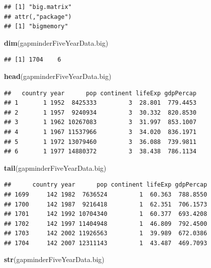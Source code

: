\documentclass[]{article}
\newenvironment{Shaded}{\begin{snugshade}}{\end{snugshade}}
\newcommand{\KeywordTok}[1]{\textcolor[rgb]{0.13,0.29,0.53}{\textbf{{#1}}}}
\newcommand{\NormalTok}[1]{{#1}}
\begin{document}
\begin{verbatim}
## [1] "big.matrix"
## attr(,"package")
## [1] "bigmemory"
\end{verbatim}

\begin{Shaded}
\begin{Highlighting}[]
\KeywordTok{dim}\NormalTok{(gapminderFiveYearData.big)}
\end{Highlighting}
\end{Shaded}

\begin{verbatim}
## [1] 1704    6
\end{verbatim}

\begin{Shaded}
\begin{Highlighting}[]
\KeywordTok{head}\NormalTok{(gapminderFiveYearData.big)}
\end{Highlighting}
\end{Shaded}

\begin{verbatim}
##   country year      pop continent lifeExp gdpPercap
## 1       1 1952  8425333         3  28.801  779.4453
## 2       1 1957  9240934         3  30.332  820.8530
## 3       1 1962 10267083         3  31.997  853.1007
## 4       1 1967 11537966         3  34.020  836.1971
## 5       1 1972 13079460         3  36.088  739.9811
## 6       1 1977 14880372         3  38.438  786.1134
\end{verbatim}

\begin{Shaded}
\begin{Highlighting}[]
\KeywordTok{tail}\NormalTok{(gapminderFiveYearData.big)}
\end{Highlighting}
\end{Shaded}

\begin{verbatim}
##      country year      pop continent lifeExp gdpPercap
## 1699     142 1982  7636524         1  60.363  788.8550
## 1700     142 1987  9216418         1  62.351  706.1573
## 1701     142 1992 10704340         1  60.377  693.4208
## 1702     142 1997 11404948         1  46.809  792.4500
## 1703     142 2002 11926563         1  39.989  672.0386
## 1704     142 2007 12311143         1  43.487  469.7093
\end{verbatim}

\begin{Shaded}
\begin{Highlighting}[]
\KeywordTok{str}\NormalTok{(gapminderFiveYearData.big)}
\end{Highlighting}
\end{Shaded}
\end{document}
